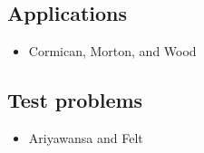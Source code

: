 \documentclass[12pt]{article}
\begin{document}
\subsection{Applications}

\begin{itemize}
\item
Cormican, Morton, and Wood~\cite{cormican1}
\end{itemize}

\subsection{Test problems}

\begin{itemize}
\item
Ariyawansa and Felt~\cite{ariyawansa2}
\end{itemize}



\end{document}
